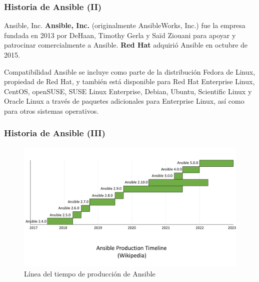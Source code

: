 \documentclass[
	11pt, %
]{beamer}
\begin{document}

\begin{frame}
	\frametitle{Historia de Ansible (II)}
	
	\begin{block}{Ansible, Inc.}
		\textbf{Ansible, Inc.} (originalmente AnsibleWorks, Inc.) fue la empresa fundada en 2013 por DeHaan, Timothy Gerla y Saïd Ziouani para apoyar y patrocinar comercialmente a Ansible.  \textbf{Red Hat} adquirió Ansible en octubre de 2015.

	\end{block}
        \begin{block}{Compatibilidad}
            Ansible se incluye como parte de la distribución Fedora de Linux, propiedad de Red Hat, y también está disponible para Red Hat Enterprise Linux, CentOS, openSUSE, SUSE Linux Enterprise, Debian, Ubuntu, Scientific Linux y Oracle Linux a través de paquetes adicionales para Enterprise Linux, así como para otros sistemas operativos. \cite{p2}
        \end{block}
	
\end{frame}


\begin{frame}
	\frametitle{Historia de Ansible (III)}

        \begin{figure}
		\includegraphics[width=1.0\linewidth]{timeline.pdf}
            \caption{Línea del tiempo de producción de Ansible}
	\end{figure}
	
\end{frame}

\end{document}
